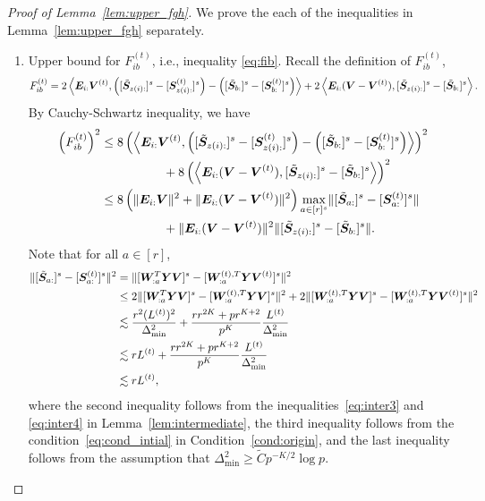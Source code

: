 \documentclass[lettersize,onecolumn,journal]{IEEEtran}
\theoremstyle{definition}
\theoremstyle{definition}
\newcommand{\of}[1]{\left(#1\right)}
\newcommand{\ang}[1]{\left\langle#1\right\rangle}
\begin{document}
\begin{proof}[Proof of Lemma~\ref{lem:upper_fgh}]
We prove the each of the inequalities in Lemma~\ref{lem:upper_fgh} separately.
\begin{enumerate}[wide]
    \item Upper bound for $F_{ib}^{(t)}$, i.e., inequality \eqref{eq:fib}. Recall the definition of $F_{ib}^{(t)}$,
    \begin{align}
         F_{ib}^{(t)} = 2 \ang{\mE_{i:} \mV^{(t)}, \of{ [ \tilde \mS_{z(i):} ]^s  - [\mS_{z(i):}^{(t)} ]^s  }  - \of{  [  \tilde \mS_{b:} ]^s  - [ \mS_{b:}^{(t)} ]^s  }  }  + 2 \ang{ \mE_{i:}(\mV - \mV^{(t)} ), [ \tilde \mS_{z(i):} ]^s - [ \tilde \mS_{b:} ]^s  }.
    \end{align}
    By Cauchy-Schwartz inequality, we have 
    \begin{align}
        \of{F_{ib}^{(t)}}^2 & \leq 8 \of{\ang{\mE_{i:} \mV^{(t)}, \of{ [  \tilde \mS_{z(i):} ]^s  -  [  \mS_{z(i):}^{(t)} ]^s  }  - \of{  [  \tilde \mS_{b:} ]^s  -  [  \mS_{b:}^{(t)} ]^s  }  }  }^2 \\
         & \quad \quad \quad \quad \quad + 8\of{ \ang{ \mE_{i:} (\mV - \mV^{(t)} ), [  \tilde \mS_{z(i):} ]^s - [ \tilde  \mS_{b:} ]^s  }}^2 \\
         & \leq 8 \of{ \onormSize{}{\mE_{i:} \mV}^2 + \onormSize{}{\mE_{i:} ( \mV - \mV^{(t)} )}^2 } \max_{a \in [r]^s} \onormSize{}{  [  \tilde \mS_{a:} ]^s - [   \mS_{a:}^{(t)} ]^s  } \\
          & \quad \quad \quad \quad \quad +\onormSize{}{\mE_{i:} ( \mV - \mV^{(t)} )}^2  \onormSize{}{  [  \tilde \mS_{z(i):} ]^s - [  \tilde \mS_{b:} ]^s  }. \label{eq:fib_decomp}
    \end{align}
    Note that for all $a \in [r]$,
    \begin{align}
        \onormSize{}{  [  \tilde \mS_{a:} ]^s - [   \mS_{a:}^{(t)} ]^s  }^2 &= \onormSize{}{ [ \mW_{:a}^T \mY \mV ]^s - [ \mW_{:a}^{(t),T} \mY \mV^{(t)} ]^s }^2 \\
        &\leq 2 \onormSize{}{ [ \mW_{:a}^T \mY \mV ]^s  - [ \mW_{:a}^{(t),T} \mY \mV ]^s  }^2 + 2 \onormSize{}{[ \mW_{:a}^{(t),T} \mY \mV ]^s - [ \mW_{:a}^{(t),T} \mY \mV^{(t)} ]^s }^2\\
        & \lesssim \frac{ r^2 (L^{(t)})^2}{ \Delta_{\min}^2} + \frac{ r r^{2K} + p r^{K+2}}{p^K} \frac{L^{(t)}}{\Delta_{\min}^2}\\
        & \lesssim  r L^{(t)}+  \frac{ r r^{2K} + p r^{K+2}}{p^K} \frac{L^{(t)}}{\Delta_{\min}^2}\\
        & \lesssim  r L^{(t)},\label{eq:fib_1}
    \end{align}
    where the second inequality follows from the inequalities~\eqref{eq:inter3} and \eqref{eq:inter4} in Lemma~\ref{lem:intermediate}, the third inequality follows from the condition~\eqref{eq:cond_intial} in Condition~\ref{cond:origin}, and the last inequality follows from the assumption that $\Delta_{\min}^2 \geq \tilde C p^{-K/2}\log p$. 
    

\end{enumerate}
\end{proof}
\end{document}
